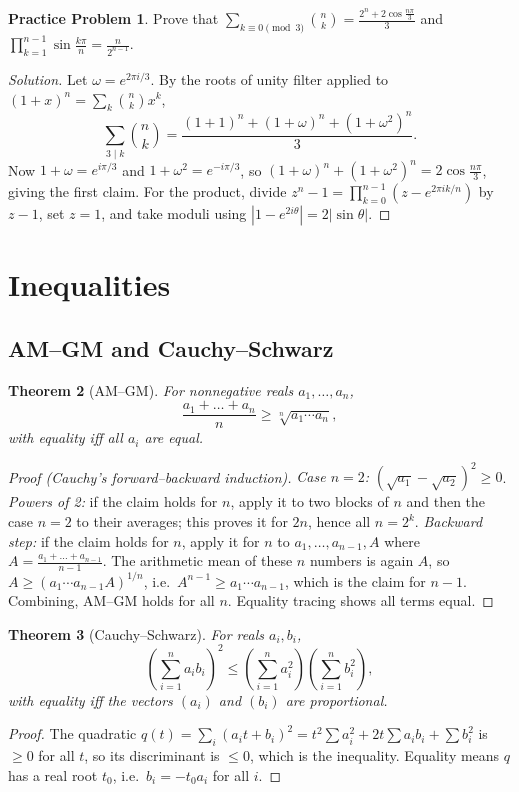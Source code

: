 \documentclass[11pt]{article}
\theoremstyle{plain}
\newtheorem{theorem}{Theorem}[section]
\theoremstyle{definition}
\newtheorem{problem}[theorem]{Practice Problem}
\newenvironment{solution}{\begin{proof}[Solution]}{\end{proof}}
\begin{document}
\begin{problem}
Prove that $\displaystyle\sum_{k \equiv 0 \pmod 3} \binom{n}{k}
= \frac{2^n + 2\cos\frac{n\pi}{3}}{3}$ and $\displaystyle\prod_{k=1}^{n-1}\sin\frac{k\pi}{n} = \frac{n}{2^{n-1}}$.
\end{problem}
\begin{solution}
Let $\omega = e^{2\pi i/3}$. By the roots of unity filter applied to
$(1+x)^n = \sum_k \binom nk x^k$,
\[
\sum_{3 \mid k}\binom nk = \frac{(1+1)^n + (1+\omega)^n + (1+\omega^2)^n}{3}.
\]
Now $1+\omega = e^{i\pi/3}$ and $1+\omega^2 = e^{-i\pi/3}$, so
$(1+\omega)^n + (1+\omega^2)^n = 2\cos\frac{n\pi}{3}$, giving the first claim.
For the product, divide $z^n - 1 = \prod_{k=0}^{n-1}(z - e^{2\pi i k/n})$ by $z-1$, set $z=1$, and take moduli using $|1 - e^{2i\theta}| = 2|\sin\theta|$.
\end{solution}

\section{Inequalities}

\subsection{AM--GM and Cauchy--Schwarz}
\begin{theorem}[AM--GM]
For nonnegative reals $a_1,\dots,a_n$,
\[
\frac{a_1+\dots+a_n}{n} \ge \sqrt[n]{a_1\cdots a_n},
\]
with equality iff all $a_i$ are equal.
\end{theorem}

\begin{proof}[Proof (Cauchy's forward--backward induction)]
\emph{Case $n=2$:} $(\sqrt{a_1}-\sqrt{a_2})^2 \ge 0$.
\emph{Powers of 2:} if the claim holds for $n$, apply it to two blocks of $n$
and then the case $n=2$ to their averages; this proves it for $2n$, hence all
$n = 2^k$.
\emph{Backward step:} if the claim holds for $n$, apply it for $n$ to
$a_1,\dots,a_{n-1}, A$ where $A = \frac{a_1+\dots+a_{n-1}}{n-1}$. The
arithmetic mean of these $n$ numbers is again $A$, so
$A \ge (a_1\cdots a_{n-1} A)^{1/n}$, i.e.\ $A^{n-1} \ge a_1\cdots a_{n-1}$,
which is the claim for $n-1$. Combining, AM--GM holds for all $n$. Equality
tracing shows all terms equal.
\end{proof}

\begin{theorem}[Cauchy--Schwarz]
For reals $a_i, b_i$,
\[
\left(\sum_{i=1}^n a_i b_i\right)^2 \le
\left(\sum_{i=1}^n a_i^2\right)\left(\sum_{i=1}^n b_i^2\right),
\]
with equality iff the vectors $(a_i)$ and $(b_i)$ are proportional.
\end{theorem}
\begin{proof}
The quadratic $q(t) = \sum_i (a_i t + b_i)^2 = t^2\sum a_i^2 + 2t \sum a_ib_i +
\sum b_i^2$ is $\ge 0$ for all $t$, so its discriminant is $\le 0$, which is the
inequality. Equality means $q$ has a real root $t_0$, i.e.\ $b_i = -t_0 a_i$ for all $i$.
\end{proof}
\end{document}
